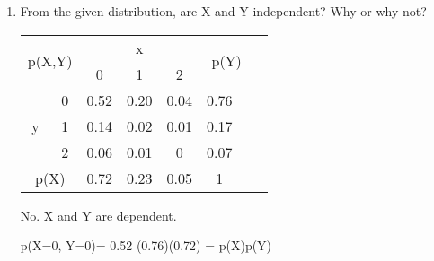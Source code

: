 \documentclass[fleqn]{article}
\begin{document}
\begin{enumerate}
\begin{enumerate}
		\item %
		From the given distribution, are X and Y independent? Why or why not?	\\
		\begin{center}
			\begin{tabular}{|cc|c|c|c|c|cc|}

			\cline{1-7}
			\multicolumn{2}{|c}{\multirow{2}{*}{p(X,Y)}}	&  
			\multicolumn{3}{|c|}{x}							&
			\multicolumn{2}{c|}{\multirow{2}{*}{p(Y)}} 
														\\ 	\cline{3-5}
		 	& &0 &1 &2 									\\	\cline{1-7}	

		 
			\multicolumn{1}{|c}{\multirow{3}{*}{y}}  & 
			\multicolumn{1}{|c|}{0} &0.52 &0.20 &0.04 	 &0.76	\\ \cline{2-6}  &
			\multicolumn{1}{|c|}{1} &0.14 &0.02 &0.01 	 &0.17	\\ \cline{2-6}  &
			\multicolumn{1}{|c|}{2} &0.06 &0.01 &0	  	 &0.07	\\ \cline{1-6}
			\multicolumn{2}{|c|}{p(X)} &0.72 &0.23 &0.05 &1		\\	\cline{1-6}
			\end{tabular}
		\end{center}		
		
		No. X and Y are dependent.
		\begin{flalign*}		
		p(X=0, Y=0)= 0.52 \neq (0.76)(0.72) = p(X)p(Y)
		\end{flalign*}
		
	\end{enumerate}

\end{enumerate}
\end{document}
